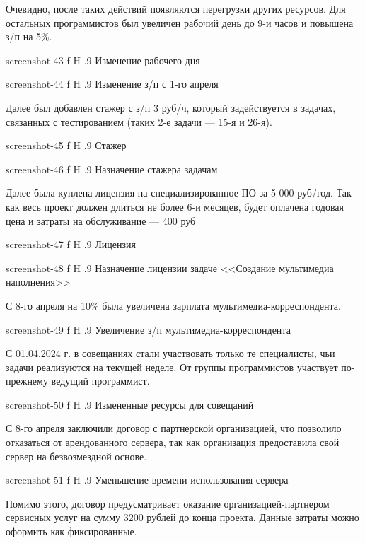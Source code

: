 \documentclass{bmstu}
\begin{document}
Очевидно, после таких действий появляются перегрузки других ресурсов. 
Для остальных программистов был увеличен рабочий день до 9-и часов и повышена з/п на 5\%.

    {screenshot-43}
    {f}
    {H}
    {.9\textwidth}
    {Изменение рабочего дня}

    {screenshot-44}
    {f}
    {H}
    {.9\textwidth}
    {Изменение з/п с 1-го апреля}
    
Далее был добавлен стажер с з/п 3 руб/ч, который задействуется в задачах, связанных с тестированием (таких 2-е задачи --- 15-я и 26-я).

    {screenshot-45}
    {f}
    {H}
    {.9\textwidth}
    {Стажер}

    {screenshot-46}
    {f}
    {H}
    {.9\textwidth}
    {Назначение стажера задачам}
    
Далее была куплена лицензия на специализированное ПО за 5 000 руб/год. 
Так как весь проект должен длиться не более 6-и месяцев, будет оплачена годовая цена и затраты на обслуживание --- 400 руб

    {screenshot-47}
    {f}
    {H}
    {.9\textwidth}
    {Лицензия}

    {screenshot-48}
    {f}
    {H}
    {.9\textwidth}
    {Назначение лицензии задаче <<Создание мультимедиа наполнения>>}
    
С 8-го апреля на 10\% была увеличена зарплата мультимедиа-корреспондента.

    {screenshot-49}
    {f}
    {H}
    {.9\textwidth}
    {Увеличение з/п мультимедиа-корреспондента}
    
С 01.04.2024 г. в совещаниях стали участвовать только те специалисты, чьи задачи реализуются на текущей неделе. 
От группы программистов участвует по-прежнему ведущий программист.

    {screenshot-50}
    {f}
    {H}
    {.9\textwidth}
    {Измененные ресурсы для совещаний}
    
С 8-го апреля заключили договор с партнерской организацией, что позволило отказаться от арендованного сервера, так как организация предоставила свой сервер на безвозмездной основе.

    {screenshot-51}
    {f}
    {H}
    {.9\textwidth}
    {Уменьшение времени использования сервера}

Помимо этого, договор предусматривает оказание организацией-партнером сервисных услуг на сумму 3200 рублей до конца проекта. 
Данные затраты можно оформить как фиксированные.
\end{document}

